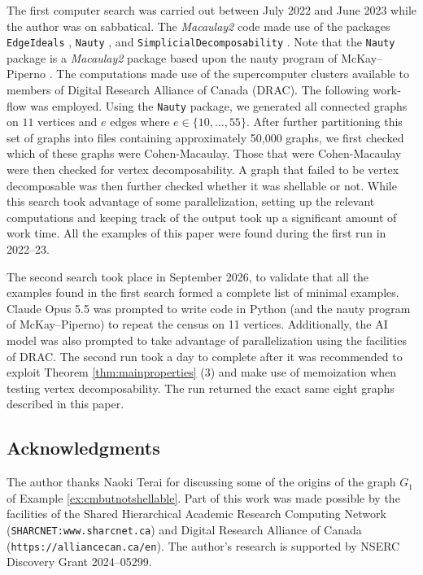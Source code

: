\documentclass[10pt,a4paper]{amsart}
\theoremstyle{plain}
\theoremstyle{definition}
\theoremstyle{remark}
\numberwithin{equation}{section}
\numberwithin{equation}{section}
\begin{document}
The first computer search was carried out between July 2022 and June 2023 while
the author was on sabbatical.  The {\it Macaulay2} code 
made use of the packages
{\tt EdgeIdeals} \cite{edge}, {\tt Nauty} \cite{nauty}, and
{\tt SimplicialDecomposability} \cite{simpdecomp}.   Note that the 
{\tt Nauty} package is a {\it Macaulay2} package  based upon the
nauty program of McKay--Piperno \cite{MP2013}.   The 
computations made use of the supercomputer clusters available to 
members of Digital Research Alliance of Canada (DRAC).
The following work-flow was employed.  Using the {\tt Nauty} package, 
we generated all connected graphs on 
$11$ vertices and $e$ edges where $e \in \{10,\ldots,55\}$.  After
further partitioning this set of graphs into files containing approximately
50,000 graphs, we first
checked which of these graphs were Cohen-Macaulay.  Those that 
were Cohen-Macaulay were then checked for vertex decomposability.
A graph that failed to be vertex decomposable was then further 
checked whether it was shellable or not.  
While this search took advantage of some parallelization, setting up 
the relevant computations and keeping track of the output took up a significant
amount of work time.  All the examples of this paper were found during
the first run in 2022--23.

The second search took place in  September 2026, to validate
that all the examples found in the first search formed a  complete list 
of minimal examples.  Claude Opus 5.5 was
prompted to write code in Python (and the nauty program of McKay--Piperno)
to repeat the census on 11 vertices.  Additionally, the AI model was also prompted to take advantage of parallelization
using the facilities of  DRAC.  
The second run took a day to complete after it was recommended to exploit
Theorem \ref{thm:mainproperties} (3) and make use of memoization when
testing vertex decomposability.  The run returned the exact same eight
graphs described in this paper.


\subsection*{Acknowledgments}
The author thanks Naoki Terai for discussing some of 
the origins of the graph $G_1$ of Example \ref{ex:cmbutnotshellable}. 
Part of this work was made possible by the 
facilities of the Shared Hierarchical Academic 
Research Computing Network 
({\tt SHARCNET:www.sharcnet.ca}) and 
Digital Research Alliance of Canada 
({\tt https://alliancecan.ca/en}).
The author's research is supported by NSERC Discovery Grant 2024--05299. 
\end{document}
